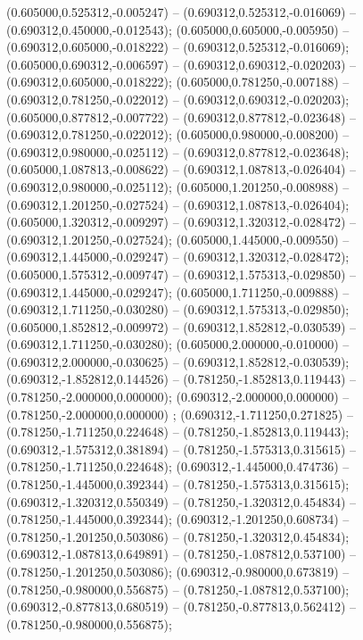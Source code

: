  (0.605000,0.525312,-0.005247) -- (0.690312,0.525312,-0.016069) -- (0.690312,0.450000,-0.012543);
 (0.605000,0.605000,-0.005950) -- (0.690312,0.605000,-0.018222) -- (0.690312,0.525312,-0.016069);
 (0.605000,0.690312,-0.006597) -- (0.690312,0.690312,-0.020203) -- (0.690312,0.605000,-0.018222);
 (0.605000,0.781250,-0.007188) -- (0.690312,0.781250,-0.022012) -- (0.690312,0.690312,-0.020203);
 (0.605000,0.877812,-0.007722) -- (0.690312,0.877812,-0.023648) -- (0.690312,0.781250,-0.022012);
 (0.605000,0.980000,-0.008200) -- (0.690312,0.980000,-0.025112) -- (0.690312,0.877812,-0.023648);
 (0.605000,1.087813,-0.008622) -- (0.690312,1.087813,-0.026404) -- (0.690312,0.980000,-0.025112);
 (0.605000,1.201250,-0.008988) -- (0.690312,1.201250,-0.027524) -- (0.690312,1.087813,-0.026404);
 (0.605000,1.320312,-0.009297) -- (0.690312,1.320312,-0.028472) -- (0.690312,1.201250,-0.027524);
 (0.605000,1.445000,-0.009550) -- (0.690312,1.445000,-0.029247) -- (0.690312,1.320312,-0.028472);
 (0.605000,1.575312,-0.009747) -- (0.690312,1.575313,-0.029850) -- (0.690312,1.445000,-0.029247);
 (0.605000,1.711250,-0.009888) -- (0.690312,1.711250,-0.030280) -- (0.690312,1.575313,-0.029850);
 (0.605000,1.852812,-0.009972) -- (0.690312,1.852812,-0.030539) -- (0.690312,1.711250,-0.030280);
 (0.605000,2.000000,-0.010000) -- (0.690312,2.000000,-0.030625) -- (0.690312,1.852812,-0.030539);
 (0.690312,-1.852812,0.144526) -- (0.781250,-1.852813,0.119443) -- (0.781250,-2.000000,0.000000);
 (0.690312,-2.000000,0.000000) -- (0.781250,-2.000000,0.000000) ;
 (0.690312,-1.711250,0.271825) -- (0.781250,-1.711250,0.224648) -- (0.781250,-1.852813,0.119443);
 (0.690312,-1.575312,0.381894) -- (0.781250,-1.575313,0.315615) -- (0.781250,-1.711250,0.224648);
 (0.690312,-1.445000,0.474736) -- (0.781250,-1.445000,0.392344) -- (0.781250,-1.575313,0.315615);
 (0.690312,-1.320312,0.550349) -- (0.781250,-1.320312,0.454834) -- (0.781250,-1.445000,0.392344);
 (0.690312,-1.201250,0.608734) -- (0.781250,-1.201250,0.503086) -- (0.781250,-1.320312,0.454834);
 (0.690312,-1.087813,0.649891) -- (0.781250,-1.087812,0.537100) -- (0.781250,-1.201250,0.503086);
 (0.690312,-0.980000,0.673819) -- (0.781250,-0.980000,0.556875) -- (0.781250,-1.087812,0.537100);
 (0.690312,-0.877813,0.680519) -- (0.781250,-0.877813,0.562412) -- (0.781250,-0.980000,0.556875);
